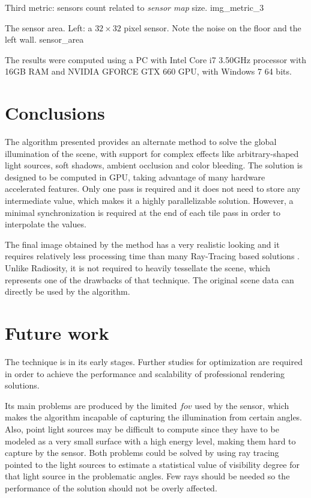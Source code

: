 \documentclass[10pt, conference]{IEEEtran}
\begin{document}
\subimages
	{Third metric: sensors count related to \emph{sensor map} size.}
	{img_metric_3}{
}


\subimages
	{The sensor area. Left: a $32 \times 32$ pixel sensor. Note the noise on the floor and the left wall.}
	{sensor_area}{
}

The results were computed using a PC with Intel Core i7 3.50GHz processor with 16GB RAM and NVIDIA GFORCE GTX 660 GPU, with Windows 7 64 bits.


\section{Conclusions}
%
The algorithm presented provides an alternate method to solve the global illumination of the scene, with support for complex effects like arbitrary-shaped light sources, soft shadows, ambient occlusion and color bleeding. 
The solution is designed to be computed in GPU, taking advantage of many hardware accelerated features. 
Only one pass is required and it does not need to store any intermediate value, which makes it a highly parallelizable solution. 
However, a minimal synchronization is required at the end of each tile pass in order to interpolate the values.\

The final image obtained by the method has a very realistic looking and it requires relatively less processing time than many Ray-Tracing based solutions \cite{ray_tracing}.
Unlike Radiosity, it is not required to heavily tessellate the scene, which represents one of the drawbacks of that technique. 
The original scene data can directly be used by the algorithm.


\section{Future work}
%
The technique is in its early stages. Further studies for optimization are required in order to achieve the performance and scalability of professional rendering solutions.\

Its main problems are produced by the limited $fov$ used by the sensor, which makes the algorithm incapable of capturing the illumination from certain angles.
Also, point light sources may be difficult to compute since they have to be modeled as a very small surface with a high energy level, making them hard to capture by the sensor.
Both problems could be solved by using ray tracing pointed to the light sources to estimate a statistical value of visibility degree for that light source in the problematic angles. 
Few rays should be needed so the performance of the solution should not be overly affected.\
\end{document}
